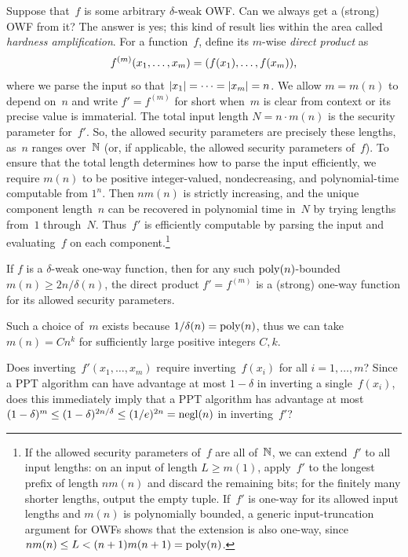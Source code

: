 \documentclass[11pt]{article}
\begin{document}
Suppose that~$f$ is some arbitrary $\delta$-weak OWF\@.
Can we always get a (strong) OWF from it?
The answer is yes; this kind of result lies within the area called \emph{hardness amplification}.
For a function~$f$, define its $m$-wise \emph{direct product} as
\[ f^{(m)}(x_{1}, \ldots, x_{m}) = (f(x_{1}), \ldots, f(x_{m}))\text, \] where we parse the input so that $\lvert x_{1}\rvert = \cdots = \lvert x_{m}\rvert = n$.
We allow $m=m(n)$ to depend on~$n$ and write $f'=f^{(m)}$ for short when~$m$ is clear from context or its precise value is immaterial.
The total input length $N=n \cdot m(n)$ is the security parameter for~$f'$.
So, the allowed security parameters are precisely these lengths, as~$n$ ranges over~$\mathbb{N}$ (or, if applicable, the allowed security parameters of~$f$).
To ensure that the total length determines how to parse the input efficiently, we require $m(n)$ to be positive integer-valued, nondecreasing, and polynomial-time computable from $1^n$.
Then $nm(n)$ is strictly increasing, and the unique component length~$n$ can be recovered in polynomial time in~$N$ by trying lengths from~$1$ through~$N$.
Thus~$f'$ is efficiently computable by parsing the input and evaluating~$f$ on each component.\footnote{If the allowed security parameters of~$f$ are all of~$\mathbb{N}$, we can extend~$f'$ to all input lengths: on an input of length $L\geq m(1)$, apply~$f'$ to the longest prefix of length $nm(n)$ and discard the remaining bits; for the finitely many shorter lengths, output the empty tuple.
  If~$f'$ is one-way for its allowed input lengths and $m(n)$ is polynomially bounded, a generic input-truncation argument for OWFs shows that the extension is also one-way, since $nm(n)\leq L<(n+1)m(n+1)=\operatorname{poly}(n)$.}

\begin{theorem}
  \label{thm:weak-strong-owf}
  If $f$ is a $\delta$-weak one-way function, then for any such $\operatorname{poly}(n)$-bounded $m(n) \geq 2n/\delta(n)$, the direct product $f' = f^{(m)}$ is a (strong) one-way function for its allowed security parameters.
\end{theorem}

Such a choice of~$m$ exists because $1/\delta(n)=\operatorname{poly}(n)$, thus we can take $m(n)=Cn^k$ for sufficiently large positive integers $C,k$.

\begin{question}
  Does inverting~$f'(x_{1}, \ldots, x_{m})$ require inverting~$f(x_{i})$ for all $i=1,\ldots,m$?
  Since a PPT algorithm can have advantage at most $1-\delta$ in inverting a single~$f(x_{i})$, does this immediately imply that a PPT algorithm has advantage at most $(1-\delta)^{m} \leq (1-\delta)^{2n/\delta} \leq (1/e)^{2n} = \operatorname{negl}(n)$ in inverting~$f'$?
\end{question}
\end{document}
